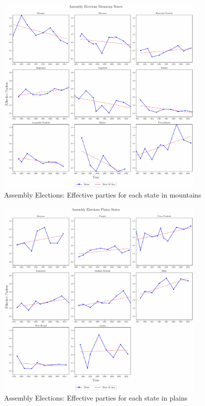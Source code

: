 
\begin{figure}[htbp]
    \centering
    \includegraphics[width=0.9\textwidth]{figures/assembly/assembly_elections_mountain_states.pdf}
    \caption{Assembly Elections:  Effective parties for each state in mountains}
    \label{img:assembly_mountain_enp}
\end{figure}

\begin{figure}[htbp]
    \centering
    \includegraphics[width=0.9\textwidth]{figures/assembly/assembly_elections_plains_states.pdf}
    \caption{Assembly Elections:  Effective parties for each state in plains}
    \label{img:assembly_plain_enp}
\end{figure}


